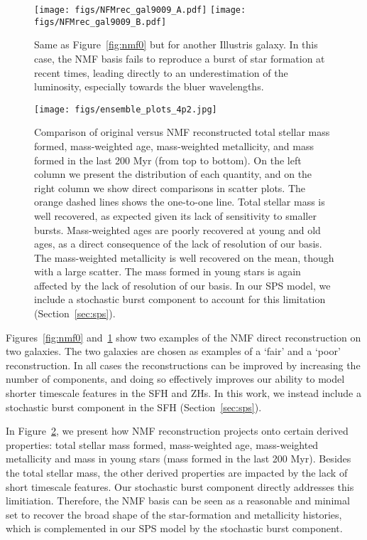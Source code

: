 \begin{figure}
\begin{center}
\texttt{[image: figs/NFMrec\_gal9009\_A.pdf]}
\texttt{[image: figs/NFMrec\_gal9009\_B.pdf]}
    \caption{
    Same as Figure~\ref{fig:nmf0} but for another Illustris galaxy. 
    In this case, the NMF basis fails to reproduce a burst of star formation at
    recent times, leading directly to an underestimation of the luminosity,
    especially towards the bluer wavelengths.
    }\label{fig:nmf1}
\end{center}
\end{figure}

\begin{figure}
\begin{center}
\texttt{[image: figs/ensemble\_plots\_4p2.jpg]}
    \caption{
    Comparison of original versus NMF reconstructed total stellar mass formed,
    mass-weighted age, mass-weighted metallicity, and mass formed in the last
    200 Myr (from top to bottom). 
    On the left column we present the distribution of each quantity, and on the
    right column we show direct comparisons in scatter plots. 
    The orange dashed lines shows the one-to-one line.
    Total stellar mass is well recovered, as expected given its lack of
    sensitivity to smaller bursts. 
    Mass-weighted ages are poorly recovered at young and old ages, as a direct
    consequence of the lack of resolution of our basis.
    The mass-weighted metallicity is well recovered on the mean, though with a
    large scatter. 
    The mass formed in young stars is again affected by the lack of resolution
    of our basis. 
    In our SPS model, we include a stochastic burst component to account for
    this limitation (Section~\ref{sec:sps}). 
    }\label{fig:nmf2}
\end{center}
\end{figure}

Figures~\ref{fig:nmf0} and~\ref{fig:nmf1} show two examples of the NMF direct
reconstruction on two galaxies. 
The two galaxies are chosen as examples of a `fair' and a `poor' reconstruction.
In all cases the reconstructions can be improved by increasing the number of
components, and doing so effectively improves our ability to model shorter
timescale features in the SFH and ZHs.
In this work, we instead include a stochastic burst component in the SFH
(Section~\ref{sec:sps}). 

In Figure~\ref{fig:nmf2}, we present how NMF reconstruction projects onto
certain derived properties: total stellar mass formed, mass-weighted age,
mass-weighted metallicity and mass in young stars (mass formed in the last 200
Myr).
Besides the total stellar mass, the other derived properties are impacted by
the lack of short timescale features. 
Our stochastic burst component directly addresses this limitiation. 
Therefore, the NMF basis can be seen as a reasonable and minimal set to recover
the broad shape of the star-formation and metallicity histories, which is
complemented in our SPS model by the stochastic burst component.
